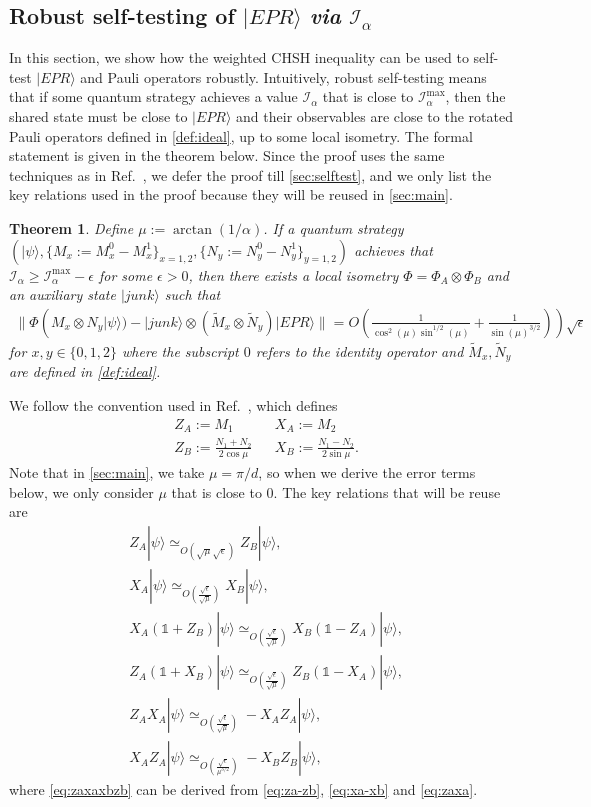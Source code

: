 \documentclass[11pt,letterpaper]{article}
\newcommand{\ket}[1]{|#1\rangle}
\newcommand{\x}{\otimes}
\newcommand{\1}{\mathbb{1}}
\newcommand{\tM}{\tilde{M}}
\newcommand{\tN}{\tilde{N}}
\newcommand{\I}{\mathcal{I}}
\newcommand{\se}{\sqrt{\epsilon}}
\newcommand{\appd}[1]{\simeq_{#1}}
\newtheorem{theorem}{Theorem}[section]
\theoremstyle{definition}
\begin{document}
\subsection{Robust self-testing of $\ket{EPR}$ \textit{via} $\I_\alpha$}
\label{sec:chsh}
In this section, we show how the weighted CHSH inequality can be used to self-test $\ket{EPR}$ and Pauli operators robustly.
Intuitively, robust self-testing means that if some quantum strategy achieves a value $\I_\alpha$ that is close to $\I_\alpha^{\max}$,
then the shared state must be close to $\ket{EPR}$ and their observables are close to the rotated Pauli operators 
defined in \cref{def:ideal},
up to some local isometry.
The formal statement is given in the theorem below. Since the proof uses the same techniques as in Ref.~\cite{bamps2015},
we defer the proof till \cref{sec:selftest}, and we only list the key relations used in the proof because they will be reused in \cref{sec:main}.
\begin{theorem}
\label{thm:selftest}
    Define $\mu := \arctan(1/\alpha)$.
	If a quantum strategy $(\ket{\psi}, \{M_x:=M_x^0-M_x^1\}_{x=1,2}, \{N_y :=N_y^0-N_y^1\}_{y = 1,2} )$ achieves that
	$\I_\alpha \geq \I_\alpha^{\max} - \epsilon$
	for some $\epsilon > 0$, then
	there exists a local isometry $\Phi = \Phi_A \x \Phi_B$ and an auxiliary state $\ket{junk}$  such that
	\begin{align*}
		\| \Phi( M_x \x N_y \ket{\psi}) -\ket{junk} \x (\tM_x \x \tN_y) \ket{EPR}  \| = O(\frac{1}{\cos^2(\mu)\sin^{1/2}(\mu)}+
		\frac{1}{\sin(\mu)^{3/2}})) \sqrt{\epsilon}
	\end{align*}
	for $x,y \in \{0, 1, 2\}$ where the subscript $0$ refers to the identity operator and $\tM_x, \tN_y$ are 
	defined in \cref{def:ideal}.  
\end{theorem}
We follow the convention used in Ref.~\cite{bamps2015},
which defines
\begin{align*}
	&Z_A := M_1 && X_A := M_2\\
	&Z_B := \frac{N_1+N_2}{2\cos{\mu}} && X_B := \frac{N_1-N_2}{2\sin{\mu}}.
\end{align*}
Note that in \cref{sec:main}, we take $\mu = \pi/d$, so
when we derive the error terms below, we only consider $\mu$ 
that is close to $0$.
The key relations that will be reuse are
\begin{align}
	\label{eq:za-zb}& Z_A\ket{\psi} \appd{O( \sqrt{\mu} \se)} Z_B\ket{\psi},\\
	\label{eq:xa-xb}&X_A\ket{\psi} \appd{O(\frac{\se}{\sqrt{\mu}})} X_B \ket{\psi}, \\
	\label{eq:xazb}&X_A(\1+Z_B)\ket{\psi} \appd{O(\frac{\se}{\sqrt{\mu}})} X_B(\1-Z_A) \ket{\psi},\\
	\label{eq:zaxb}&Z_A(\1+X_B)\ket{\psi} \appd{O(\frac{\se}{\sqrt{\mu}})} Z_B(\1-X_A) \ket{\psi},\\
	\label{eq:zaxa}&Z_AX_A\ket{\psi} \appd{O(\frac{\se}{\sqrt{\mu}})} -X_AZ_A \ket{\psi},\\
	\label{eq:zaxaxbzb}&X_AZ_A \ket{\psi} \appd{O(\frac{\se}{\mu^{3/2}})} -X_BZ_B \ket{\psi},
\end{align}
where \cref{eq:zaxaxbzb} can be derived from \cref{eq:za-zb}, \cref{eq:xa-xb} and \cref{eq:zaxa}.
\end{document}
